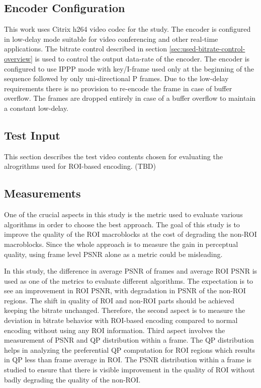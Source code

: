 \documentclass[11pt]{article} %
\begin{document}
\subsection{Encoder Configuration} \label {sec:Encoder configuration}     
This work uses Citrix h264 video codec for the study. The encoder is configured in low-delay mode suitable for video conferencing and other real-time applications. The bitrate control described in section \ref{sec:used-bitrate-control-overview} is used to control the output data-rate of the encoder. The encoder is configured to use IPPP mode with key/I-frame used only at the beginning of the sequence followed by only uni-directional P frames. Due to the low-delay requirements there is no provision to re-encode the frame in case of buffer overflow. The frames are dropped entirely in case of a buffer overflow to maintain a constant low-delay.

\subsection{Test Input}
This section describes the test video contents chosen for evaluating the alrogrithms used for ROI-based encoding. (TBD)

\subsection{Measurements}
One of the crucial aspects in this study is the metric used to evaluate various algorithms in order to choose the best approach. The goal of this study is to improve the quality of the ROI macroblocks at the cost of degrading the non-ROI macroblocks. Since the whole approach is to measure the gain in perceptual quality, using frame level PSNR alone as a metric could be misleading. 

In this study, the difference in average PSNR of frames and average ROI PSNR is used as one of the metrics to evaluate different algorithms. The expectation is to see an improvement in ROI PSNR, with degradation in PSNR of the non-ROI regions. The shift in quality of ROI and non-ROI parts should be achieved keeping the bitrate unchanged. Therefore, the second aspect is to measure the deviation in bitrate behavior with ROI-based encoding compared to normal encoding without using any ROI information. Third aspect involves the measurement of PSNR and QP distribution within a frame. The QP distribution helps in analyzing the preferential QP computation for ROI regions which results in QP less than frame average in ROI. The PSNR distribution within a frame is studied to ensure that there is visible improvement in the quality of ROI without badly degrading the quality of the non-ROI. 
\end{document}
